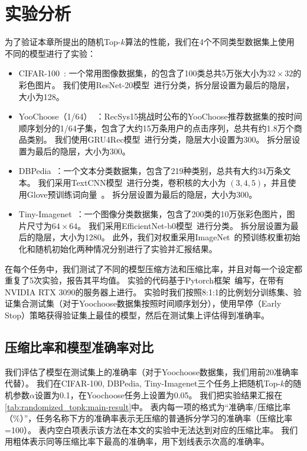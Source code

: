 \section{实验分析}

为了验证本章所提出的随机Top-$k$算法的性能，我们在4个不同类型数据集上使用不同的模型进行了实验：
\begin{itemize}
    \item CIFAR-100~\cite{krizhevsky_2009_cifar}: 一个常用图像数据集，的包含了100类总共5万张大小为$32\times 32$的彩色图片。
        我们使用ResNet-20模型~\cite{hekaiming2016resnet}进行分类，拆分层设置为最后的隐层，大小为128。
    \item YooChoose（1/64）~\cite{ben2015yoochoose,lijing_2017_narm}：RecSys15挑战时公布的YooChoose推荐数据集的按时间顺序划分的1/64子集，包含了大约15万条用户的点击序列，总共有约1.8万个商品类别。
        我们使用GRU4Rec模型~\cite{hidasi_2016_gru4rec}进行分类，隐层大小设置为300。
        拆分层设置为最后的隐层，大小为300。
    \item DBPedia~\cite{2007dbpedia}：一个文本分类数据集，包含了219种类别，总共有大约34万条文本。
        我们采用TextCNN模型~\cite{kimyoon2014textcnn}进行分类，卷积核的大小为 $(3,4,5)$，并且使用Glove预训练词向量~\cite{pennington2014glove}。
        拆分层设置为最后的隐层，大小为300。
    \item Tiny-Imagenet~\cite{tiny-imagenet}：一个图像分类数据集，包含了200类的10万张彩色图片，图片尺寸为$64\times 64$。
        我们采用EfficientNet-b0模型~\cite{tanmingxing2019efficientnet}进行分类。
        拆分层设置为最后的隐层，大小为1280。
        此外，我们对权重采用ImageNet~\cite{2009_imagenet}的预训练权重初始化和随机初始化两种情况分别进行了实验并汇报结果。
\end{itemize}

在每个任务中，我们测试了不同的模型压缩方法和压缩比率，并且对每一个设定都重复了5次实验，报告其平均值。
%
实验的代码基于Pytorch框架~\cite{2019_pytorch}编写，在带有NVIDIA RTX 3090的服务器上进行。
%
实验时我们按照8:1:1的比例划分训练集、验证集合测试集（对于Yoochoose数据集按照时间顺序划分），使用早停（Early Stop）策略获得验证集上最佳的模型，然后在测试集上评估得到准确率。



\subsection{压缩比率和模型准确率对比}
%
我们评估了模型在测试集上的准确率（对于Yoochoose数据集，我们用前20准确率代替）。
%
我们在CIFAR-100, DBPedia, Tiny-Imagenet三个任务上把随机Top-$k$的随机参数$\alpha$设置为0.1，在Yoochoose任务上设置为0.05。
%
我们把实验结果汇报在\autoref{tab:randomized_topk:main-result}中。
表内每一项的格式为“准确率/压缩比率（\%）”，任务名称下方的准确率表示无压缩的普通拆分学习的准确率（压缩比率=100）。
表内空白项表示该方法在本文的实验中无法达到对应的压缩比率。
我们用粗体表示同等压缩比率下最高的准确率，用下划线表示次高的准确率。


